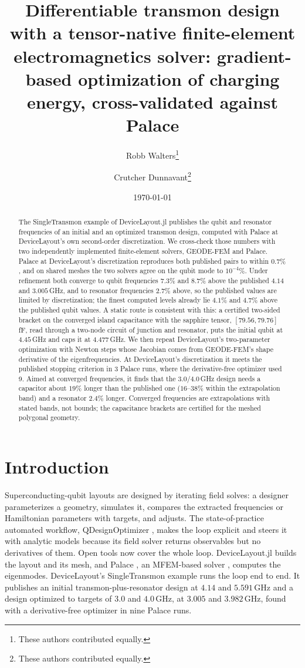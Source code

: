 \documentclass{anvil-paper}
\title{Differentiable transmon design with a tensor-native finite-element
electromagnetics solver: gradient-based optimization of charging energy,
cross-validated against Palace}
\author{Robb Walters\thanks{These authors contributed equally.}
  \and Crutcher Dunnavant\thanks{These authors contributed equally.}}
\date{\today}
\begin{document}
\maketitle

\begin{abstract}
The SingleTransmon example of DeviceLayout.jl publishes the qubit and
resonator frequencies of an initial and an optimized transmon design,
computed with Palace at DeviceLayout's own second-order discretization. We
cross-check those numbers with two independently implemented
finite-element solvers, GEODE-FEM and Palace. Palace at DeviceLayout's
discretization reproduces both published pairs to within $0.7\%$, and on
shared meshes the two solvers agree on the qubit mode to $10^{-4}\%$.
Under refinement both converge to qubit frequencies $7.3\%$ and $8.7\%$
above the published $4.14$ and $3.005$\,GHz, and to resonator frequencies
$2.7\%$ above, so the published values are limited by discretization;
the finest computed levels already lie $4.1\%$ and $4.7\%$ above the
published qubit values. A static route is consistent with this: a
certified two-sided bracket on the converged island capacitance with the
sapphire tensor, $[79.56, 79.76]$\,fF, read through a two-node circuit of
junction and resonator, puts the initial qubit at $4.45$\,GHz and caps it
at $4.477$\,GHz. We then repeat DeviceLayout's
two-parameter optimization with Newton steps whose Jacobian comes from
GEODE-FEM's shape derivative of the eigenfrequencies. At DeviceLayout's
discretization it meets the published stopping criterion in 3 Palace runs,
where the derivative-free optimizer used 9. Aimed at converged frequencies,
it finds that the $3.0$/$4.0$\,GHz design needs a capacitor about $19\%$
longer than the published one ($16$--$38\%$ within the extrapolation band)
and a resonator $2.4\%$ longer. Converged frequencies are extrapolations
with stated bands, not bounds; the capacitance brackets are certified for
the meshed polygonal geometry.
\end{abstract}

\section{Introduction}
\label{sec:intro}

Superconducting-qubit layouts are designed by iterating field solves: a
designer parameterizes a geometry, simulates it, compares the extracted
frequencies or Hamiltonian parameters with targets, and adjusts. The
state-of-practice automated workflow, QDesignOptimizer
\citep{eriksson2025automated}, makes the loop explicit and steers it with
analytic models because its field solver returns observables but no
derivatives of them. Open tools now cover the whole loop.
DeviceLayout.jl \citep{devicelayout} builds the layout and its mesh, and
Palace \citep{palace}, an MFEM-based solver \citep{mfem,andrej2024high},
computes the eigenmodes. DeviceLayout's SingleTransmon example
\citep{devicelayout-blog,devicelayout-example} runs the loop end to end.
It publishes an initial transmon-plus-resonator design at $4.14$ and
$5.591$\,GHz and a design optimized to targets of $3.0$ and $4.0$\,GHz, at
$3.005$ and $3.982$\,GHz, found with a derivative-free optimizer in nine
Palace runs.
\end{document}
